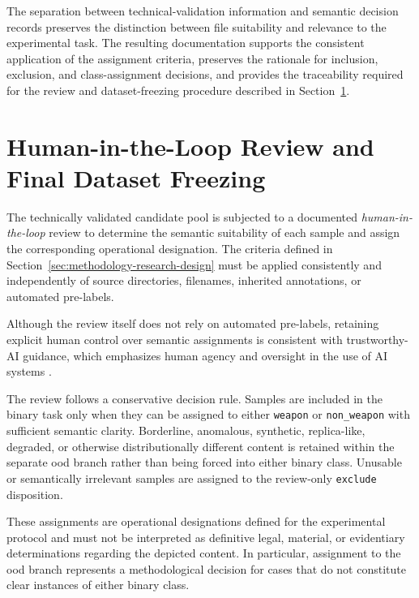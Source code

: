 The separation between technical-validation information and semantic decision
records preserves the distinction between file suitability and relevance to
the experimental task. The resulting documentation supports the consistent
application of the assignment criteria, preserves the rationale for inclusion,
exclusion, and class-assignment decisions, and provides the traceability
required for the review and dataset-freezing procedure described in
Section~\ref{sec:methodology-human-review}.

\section{Human-in-the-Loop Review and Final Dataset Freezing}
\label{sec:methodology-human-review}

The technically validated candidate pool is subjected to a documented
\textit{human-in-the-loop} review to determine the semantic suitability of each
sample and assign the corresponding operational designation. The criteria
defined in Section~\ref{sec:methodology-research-design} must be applied
consistently and independently of source directories, filenames, inherited
annotations, or automated pre-labels.

Although the review itself does not rely on automated pre-labels,
retaining explicit human control over semantic assignments is consistent
with trustworthy-AI guidance, which emphasizes human agency and oversight
in the use of AI systems \cite{EUAI2020}.

The review follows a conservative decision rule. Samples are included in the
binary task only when they can be assigned to either \texttt{weapon} or
\texttt{non\_weapon} with sufficient semantic clarity. Borderline, anomalous,
synthetic, replica-like, degraded, or otherwise distributionally different
content is retained within the separate \gls{ood} branch rather than being
forced into either binary class. Unusable or semantically irrelevant samples
are assigned to the review-only \texttt{exclude} disposition.

These assignments are operational designations defined for the experimental
protocol and must not be interpreted as definitive legal, material, or
evidentiary determinations regarding the depicted content. In particular,
assignment to the \gls{ood} branch represents a methodological decision for
cases that do not constitute clear instances of either binary class.

